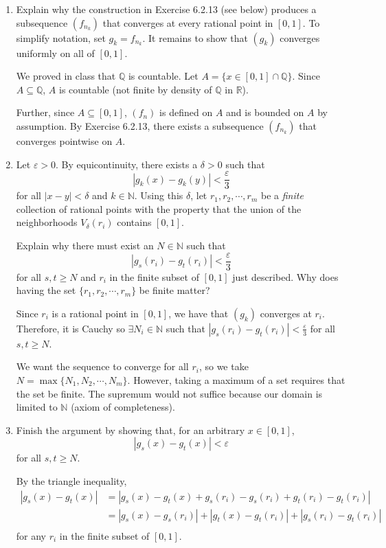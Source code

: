 \documentclass[12pt]{article}
\newcommand{\R}{\mathbb{R}}
\newcommand{\N}{\mathbb{N}}
\newcommand{\Q}{\mathbb{Q}}
\newcommand{\abs}[1]{\left\vert #1 \right\vert}
\newcommand{\ep}{\varepsilon}
\begin{document}
\begin{enumerate}
	\item Explain why the construction in Exercise 6.2.13 (see below) produces a subsequence $(f_{n_k})$ that converges at every rational point in $[0,1]$. To simplify notation, set $g_k=f_{n_k}$. It remains to show that $(g_k)$ converges uniformly on all of $[0,1]$.
	
        \color{blue}
            We proved in class that $\Q$ is countable. Let $A = \{x \in [0, 1] \cap \Q\}$. Since $A \subseteq \Q$, $A$ is countable (not finite by density of $\Q$ in $\R$).

            Further, since $A \subseteq [0, 1]$, $(f_n)$ is defined on $A$ and is bounded on $A$ by assumption. By Exercise 6.2.13, there exists a subsequence $(f_{n_k})$ that converges pointwise on $A$.
        \color{black}
        
	\item Let $\ep>0$. By equicontinuity, there exists a $\delta>0$ such that $$|g_k(x)-g_k(y)|<\frac{\ep}{3}$$
	for all $|x-y|<\delta$ and $k\in\mathbb{N}$. Using this $\delta$, let $r_1,r_2,\cdots,r_m$ be a \textit{finite} collection of rational points with the property that the union of the neighborhoods $V_\delta(r_i)$ contains $[0,1]$. 
    
    Explain why there must exist an $N\in\mathbb{N}$ such that $$|g_s(r_i)-g_t(r_i)|<\frac{\ep}{3}$$ for all $s,t\geq N$ and $r_i$ in the finite subset of $[0,1]$ just described. Why does having the set $\{r_1,r_2,\cdots,r_m \}$ be finite matter?

        \color{blue}
            Since $r_i$ is a rational point in $[0, 1]$, we have that $(g_k)$ converges at $r_i$. Therefore, it is Cauchy so $\exists N_i \in \N$ such that $\abs{g_s(r_i) - g_t(r_i)} < \frac{\ep}{3}$ for all $s, t \geq N$.

            We want the sequence to converge for all $r_i$, so we take $N = \max\{N_1, N_2, \cdots, N_m\}$. However, taking a maximum of a set requires that the set be finite. The supremum would not suffice because our domain is limited to $\N$ (axiom of completeness). 
        \color{black}

	\item Finish the argument by showing that, for an arbitrary $x\in[0,1]$, 
    \[|g_s(x)-g_t(x)|<\ep\] 
     for all $s,t\geq N$.

        \color{blue}
            By the triangle inequality, 
            \begin{align*}
                \abs{g_s(x) - g_t(x)} &= \abs{g_s(x) - g_t(x) + g_s(r_i) - g_s(r_i) + g_t(r_i) - g_t(r_i)}\\ 
                &= \abs{g_s(x) - g_s(r_i)} + \abs{g_t(x) - g_t(r_i)} + \abs{g_s(r_i) - g_t(r_i)}\\
            \end{align*}
            for any $r_i$ in the finite subset of $[0, 1]$.


\end{enumerate}
\end{document}
